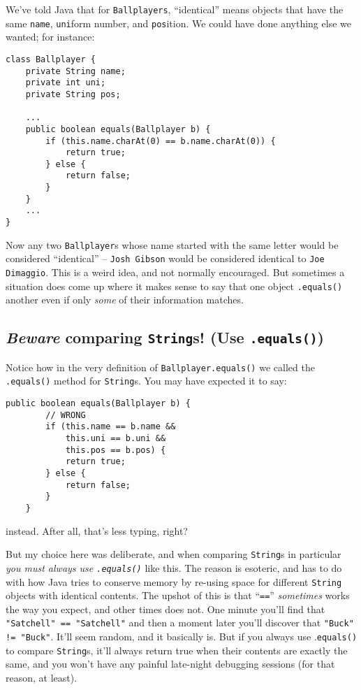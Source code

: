 We've told Java that for \texttt{Ballplayers}, ``identical'' means objects that
have the same \texttt{name}, \texttt{uni}form number, and \texttt{pos}ition.
We could have done anything else we wanted; for instance:

\begin{Verbatim}[fontsize=\footnotesize,samepage=true,frame=single]
class Ballplayer {
    private String name;
    private int uni;
    private String pos;
    
    ...
    public boolean equals(Ballplayer b) {
        if (this.name.charAt(0) == b.name.charAt(0)) {
            return true;
        } else {
            return false;
        }
    }
    ...
}
\end{Verbatim}

Now any two \texttt{Ballplayer}s whose name started with the same letter would
be considered ``identical'' -- \texttt{Josh Gibson} would be considered
identical to \texttt{Joe Dimaggio}. This is a weird idea, and not normally
encouraged. But sometimes a situation does come up where it makes sense to say
that one object \texttt{.equals()} another even if only \textit{some} of their
information matches.

\subsection{\textit{Beware} comparing \texttt{String}s! (Use \texttt{.equals()})}

Notice how in the very definition of \texttt{Ballplayer.equals()} we called
the \texttt{.equals()} method for \texttt{String}s. You may have expected it
to say:

\begin{Verbatim}[fontsize=\small,samepage=true]
    public boolean equals(Ballplayer b) {
        // WRONG
        if (this.name == b.name &&
            this.uni == b.uni &&
            this.pos == b.pos) {
            return true;
        } else {
            return false;
        }
    }
\end{Verbatim}

instead. After all, that's less typing, right?

But my choice here was deliberate, and when comparing \texttt{String}s in
particular \textit{you must always use \texttt{.equals()}} like this. The
reason is esoteric, and has to do with how Java tries to conserve memory by
re-using space for different \texttt{String} objects with identical contents.
The upshot of this is that ``\texttt{==}'' \textit{sometimes} works the way you
expect, and other times does not. One minute you'll find that
\texttt{"Satchell" == "Satchell"} and then a moment later you'll discover that
\texttt{"Buck" != "Buck"}. It'll seem random, and it basically is. But if you
always use .\texttt{equals()} to compare \texttt{String}s, it'll always return
true when their contents are exactly the same, and you won't have any painful
late-night debugging sessions (for that reason, at least).

